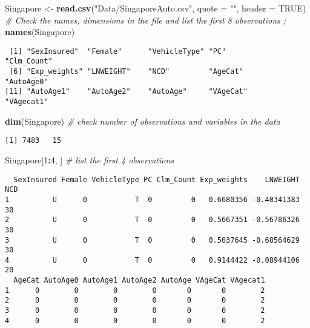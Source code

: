 \documentclass[]{book}
\newenvironment{Shaded}{\begin{snugshade}}{\end{snugshade}}
\newcommand{\KeywordTok}[1]{\textcolor[rgb]{0.13,0.29,0.53}{\textbf{#1}}}
\newcommand{\DataTypeTok}[1]{\textcolor[rgb]{0.13,0.29,0.53}{#1}}
\newcommand{\DecValTok}[1]{\textcolor[rgb]{0.00,0.00,0.81}{#1}}
\newcommand{\StringTok}[1]{\textcolor[rgb]{0.31,0.60,0.02}{#1}}
\newcommand{\CommentTok}[1]{\textcolor[rgb]{0.56,0.35,0.01}{\textit{#1}}}
\newcommand{\OtherTok}[1]{\textcolor[rgb]{0.56,0.35,0.01}{#1}}
\newcommand{\OperatorTok}[1]{\textcolor[rgb]{0.81,0.36,0.00}{\textbf{#1}}}
\newcommand{\NormalTok}[1]{#1}
\theoremstyle{definition}
\theoremstyle{definition}
\theoremstyle{definition}
\theoremstyle{remark}
\begin{document}
\begin{Shaded}
\begin{Highlighting}[]
\NormalTok{Singapore <-}\StringTok{ }\KeywordTok{read.csv}\NormalTok{(}\StringTok{"Data/SingaporeAuto.csv"}\NormalTok{, }\DataTypeTok{quote =} \StringTok{""}\NormalTok{, }\DataTypeTok{header =} \OtherTok{TRUE}\NormalTok{)}
\CommentTok{# Check the names, dimensions in the file and list the first 8 observations ;}
\KeywordTok{names}\NormalTok{(Singapore)}
\end{Highlighting}
\end{Shaded}

\begin{verbatim}
 [1] "SexInsured"  "Female"      "VehicleType" "PC"          "Clm_Count"  
 [6] "Exp_weights" "LNWEIGHT"    "NCD"         "AgeCat"      "AutoAge0"   
[11] "AutoAge1"    "AutoAge2"    "AutoAge"     "VAgeCat"     "VAgecat1"   
\end{verbatim}

\begin{Shaded}
\begin{Highlighting}[]
\KeywordTok{dim}\NormalTok{(Singapore)  }\CommentTok{# check number of observations and variables in the data}
\end{Highlighting}
\end{Shaded}

\begin{verbatim}
[1] 7483   15
\end{verbatim}

\begin{Shaded}
\begin{Highlighting}[]
\NormalTok{Singapore[}\DecValTok{1}\OperatorTok{:}\DecValTok{4}\NormalTok{, ]  }\CommentTok{# list the first 4 observations}
\end{Highlighting}
\end{Shaded}

\begin{verbatim}
  SexInsured Female VehicleType PC Clm_Count Exp_weights    LNWEIGHT NCD
1          U      0           T  0         0   0.6680356 -0.40341383  30
2          U      0           T  0         0   0.5667351 -0.56786326  30
3          U      0           T  0         0   0.5037645 -0.68564629  30
4          U      0           T  0         0   0.9144422 -0.08944106  20
  AgeCat AutoAge0 AutoAge1 AutoAge2 AutoAge VAgeCat VAgecat1
1      0        0        0        0       0       0        2
2      0        0        0        0       0       0        2
3      0        0        0        0       0       0        2
4      0        0        0        0       0       0        2
\end{verbatim}
\end{document}
